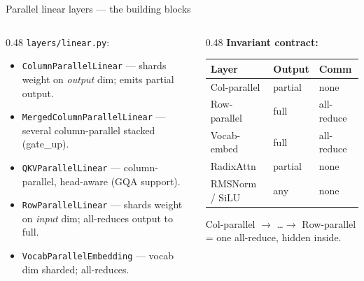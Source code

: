 \documentclass[aspectratio=169,10pt]{beamer}
\begin{document}
\begin{frame}[fragile]{Parallel linear layers --- the building blocks}
  \footnotesize
  \begin{columns}[T,onlytextwidth]
    \begin{column}{0.48\textwidth}
      \scriptsize
      \texttt{layers/linear.py}:
      \vspace{0.2cm}
      \begin{itemize}
        \item \texttt{ColumnParallelLinear} --- shards weight on \emph{output} dim; emits partial output.
        \item \texttt{MergedColumnParallelLinear} --- several column-parallel stacked (gate\_up).
        \item \texttt{QKVParallelLinear} --- column-parallel, head-aware (GQA support).
        \item \texttt{RowParallelLinear} --- shards weight on \emph{input} dim; all-reduces output to full.
        \item \texttt{VocabParallelEmbedding} --- vocab dim sharded; all-reduces.
      \end{itemize}
    \end{column}
    \begin{column}{0.48\textwidth}
      \scriptsize
      \textbf{Invariant contract:}\\[2pt]
      \begin{tabular}{@{}lll@{}}
        \toprule
        Layer & Output & Comm \\
        \midrule
        Col-parallel & partial & \textcolor{slgreen}{none} \\
        Row-parallel & full & \textcolor{slred}{all-reduce} \\
        Vocab-embed  & full & \textcolor{slred}{all-reduce} \\
        RadixAttn    & partial & \textcolor{slgreen}{none} \\
        RMSNorm / SiLU & any & \textcolor{slgreen}{none} \\
        \bottomrule
      \end{tabular}
      \vspace{0.2cm}
      Col-parallel $\to$ \dots $\to$ Row-parallel = one all-reduce, hidden inside.
    \end{column}
  \end{columns}
\end{frame}
\end{document}
